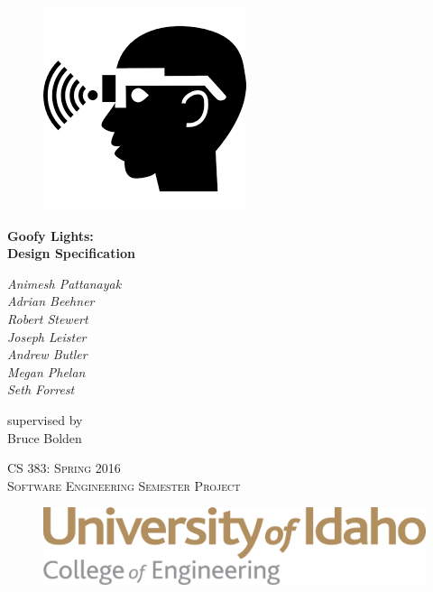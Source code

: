 \documentclass[12pt]{article}
\begin{document}
	\begin{titlepage}
		\centering	
    
    \begin{figure}[h]
      \centering
      \includegraphics[width=0.55\linewidth]{glassesIcon.png}
    \end{figure} 
  
  {\huge\bfseries Goofy Lights: \\ Design Specification\par}
  		\vspace{.25cm}
    
		{ 		
      {\Large\itshape Animesh Pattanayak\\}	
      {\Large\itshape Adrian Beehner\\}
      {\Large\itshape Robert Stewert\\}	
      {\Large\itshape Joseph Leister\\}
      {\Large\itshape Andrew Butler\\}
      {\Large\itshape Megan Phelan\\}
      {\Large\itshape Seth Forrest\\}
		}		
    \vspace{.25cm}	
    
		supervised by \\
		Bruce Bolden		
    
    \vspace{.5cm} 
    
    {\scshape\Large 
      CS 383: Spring 2016 \\
      Software Engineering Semester Project
      \par}
    
    \begin{figure}[h]
      \centering
      \includegraphics[width=0.7\linewidth]{uislogan}
    \end{figure} 
  
		\vfill		
	\end{titlepage}
\end{document}
